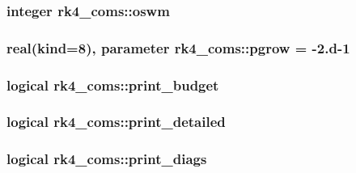 \subsubsection[{oswm}]{\setlength{\rightskip}{0pt plus 5cm}integer rk4\+\_\+coms\+::oswm}\label{namespacerk4__coms_a588b443c0107fd03a7642394a2df5cc9}
\hypertarget{namespacerk4__coms_a796865569153ec93dae2cc10d6dd7909}{}
\subsubsection[{pgrow}]{\setlength{\rightskip}{0pt plus 5cm}real(kind=8), parameter rk4\+\_\+coms\+::pgrow = -\/2.d-\/1}\label{namespacerk4__coms_a796865569153ec93dae2cc10d6dd7909}
\hypertarget{namespacerk4__coms_a062e3f5a857cb1364f87fda6223f2259}{}
\subsubsection[{print\+\_\+budget}]{\setlength{\rightskip}{0pt plus 5cm}logical rk4\+\_\+coms\+::print\+\_\+budget}\label{namespacerk4__coms_a062e3f5a857cb1364f87fda6223f2259}
\hypertarget{namespacerk4__coms_a9b7ff048a348436a9163405f31d72e29}{}
\subsubsection[{print\+\_\+detailed}]{\setlength{\rightskip}{0pt plus 5cm}logical rk4\+\_\+coms\+::print\+\_\+detailed}\label{namespacerk4__coms_a9b7ff048a348436a9163405f31d72e29}
\hypertarget{namespacerk4__coms_a45d06376c0007b5db575b229cc2d11b1}{}
\subsubsection[{print\+\_\+diags}]{\setlength{\rightskip}{0pt plus 5cm}logical rk4\+\_\+coms\+::print\+\_\+diags}\label{namespacerk4__coms_a45d06376c0007b5db575b229cc2d11b1}
\hypertarget{namespacerk4__coms_ad87029f758f9a6906b3aea2205873427}{}
